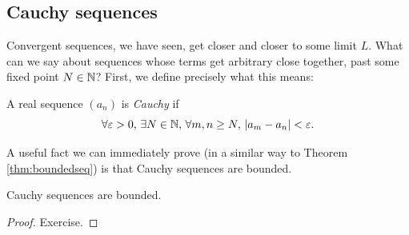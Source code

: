 \documentclass[../analysis1.tex]{subfiles}
\begin{document}
\subsection{Cauchy sequences}
Convergent sequences, we have seen, get closer and closer to some limit $L$. What can we say about sequences whose terms get arbitrary close together, past some fixed point $N\in\mathbb{N}$? First, we define precisely what this means:
\begin{definition}
    \begin{shaded*}
        A real sequence $(a_n)$ is \textit{Cauchy} if $$\forall\varepsilon>0,\,\exists N\in\mathbb{N},\, \forall m,n\ge N,\, |a_m-a_n|<\varepsilon.$$
    \end{shaded*}
\end{definition}
A useful fact we can immediately prove (in a similar way to Theorem \ref{thm:boundedseq}) is that Cauchy sequences are bounded.
\begin{lemma}
\label{lem:cauchybounded}
    \begin{shaded*}
        Cauchy sequences are bounded.
    \end{shaded*}
\end{lemma}
\begin{proof}
    Exercise.
\end{proof}
\end{document}
